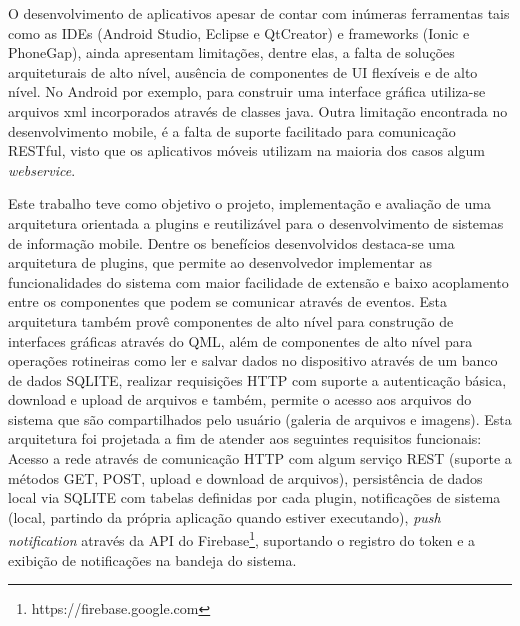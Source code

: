 O desenvolvimento de aplicativos apesar de contar com inúmeras ferramentas tais como as IDEs (Android Studio, Eclipse e QtCreator) e frameworks (Ionic e PhoneGap), ainda apresentam limitações, dentre elas, a falta de soluções arquiteturais de alto nível, ausência de componentes de UI flexíveis e de alto nível. No Android por exemplo, para construir uma interface gráfica utiliza-se arquivos xml incorporados através de classes java. Outra limitação encontrada no desenvolvimento mobile, é a falta de suporte facilitado para comunicação RESTful, visto que os aplicativos móveis utilizam na maioria dos casos algum \textit{webservice}.


Este trabalho teve como objetivo o projeto, implementação e avaliação de uma arquitetura orientada a plugins e reutilizável para o desenvolvimento de sistemas de informação mobile. Dentre os benefícios desenvolvidos destaca-se uma arquitetura de plugins, que permite ao desenvolvedor implementar as funcionalidades do sistema com maior facilidade de extensão e baixo acoplamento entre os componentes que podem se comunicar através de eventos. Esta arquitetura também provê componentes de alto nível para construção de interfaces gráficas através do QML, além de componentes de alto nível para operações rotineiras como ler e salvar dados no dispositivo através de um banco de dados SQLITE, realizar requisições HTTP com suporte a autenticação básica, download e upload de arquivos e também, permite o acesso aos arquivos do sistema que são compartilhados pelo usuário (galeria de arquivos e imagens). Esta arquitetura foi projetada a fim de atender aos seguintes requisitos funcionais: Acesso a rede através de comunicação HTTP com algum serviço REST (suporte a métodos GET, POST, upload e download de arquivos), persistência de dados local via SQLITE com tabelas definidas por cada plugin, notificações de sistema (local, partindo da própria aplicação quando estiver executando), \textit{push notification} através da API do Firebase\footnote{https://firebase.google.com}, suportando o registro do token e a exibição de notificações na bandeja do sistema.


